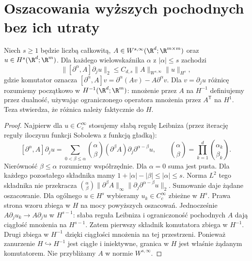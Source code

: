 \section{Oszacowania wyższych pochodnych bez ich utraty}
\begin{lemat}\label{lem:pde21-comm}
Niech $s\ge1$ będzie liczbą całkowitą,
$A\in W^{s,\infty}(\R^d;\R^{m\times m})$ oraz
$u\in H^s(\R^d;\R^m)$. Dla każdego wielowskaźnika
$\alpha$ z $|\alpha|\le s$ zachodzi
\[
 \|[\partial^\alpha,A]\partial_j u\|_2
 \le C_{d,s}\|A\|_{W^{s,\infty}}\|u\|_{H^s},
\]
gdzie komutator oznacza
$[\partial^\alpha,A]v=\partial^\alpha(Av)-A\partial^\alpha v$.
Dla $v=\partial_j u$ różnicę rozumiemy początkowo
w $H^{-1}(\R^d;\R^m)$: mnożenie przez $A$ na $H^{-1}$
definiujemy przez dualność, używając ograniczonego
operatora mnożenia przez $A^\mathsf T$ na $H^1$.
Teza stwierdza, że różnica należy faktycznie do $H$.
\end{lemat}
\begin{proof}
Najpierw dla $u\in C_c^\infty$ stosujemy słabą
regułę Leibniza (przez iterację reguły iloczynu
funkcji Sobolewa z funkcją gładką):
\[
 [\partial^\alpha,A]\partial_ju
 =\sum_{0<\beta\le\alpha}\binom{\alpha}{\beta}
 (\partial^\beta A)\partial_j\partial^{\alpha-\beta}u,
 \qquad
 \binom{\alpha}{\beta}=\prod_{k=1}^d
 \binom{\alpha_k}{\beta_k}.
\]
Nierówność $\beta\le\alpha$ rozumiemy współrzędnie.
Dla $\alpha=0$ suma jest pusta. Dla każdego
pozostałego składnika mamy
$1+|\alpha|-|\beta|\le|\alpha|\le s$.
Norma $L^2$ tego składnika nie przekracza
$\binom{\alpha}{\beta}\|\partial^\beta A\|_\infty
\|\partial_j\partial^{\alpha-\beta}u\|_2$.
Sumowanie daje żądane oszacowanie.
Dla ogólnego $u\in H^s$ wybieramy $u_k\in C_c^\infty$
zbieżne w $H^s$. Prawa strona wzoru zbiega w $H$
na mocy powyższych oszacowań. Jednocześnie
$A\partial_j u_k\to A\partial_j u$ w $H^{s-1}$:
słaba reguła Leibniza i ograniczoność pochodnych $A$
dają ciągłość mnożenia na $H^{s-1}$.
Zatem pierwszy składnik komutatora zbiega w $H^{-1}$.
Drugi zbiega w $H^{-1}$ dzięki ciągłości mnożenia
na tej przestrzeni. Ponieważ zanurzenie $H\hookrightarrow H^{-1}$
jest ciągłe i iniektywne, granica w $H$ jest właśnie
żądanym komutatorem. Nie przybliżamy $A$ w normie
$W^{s,\infty}$.
\end{proof}

